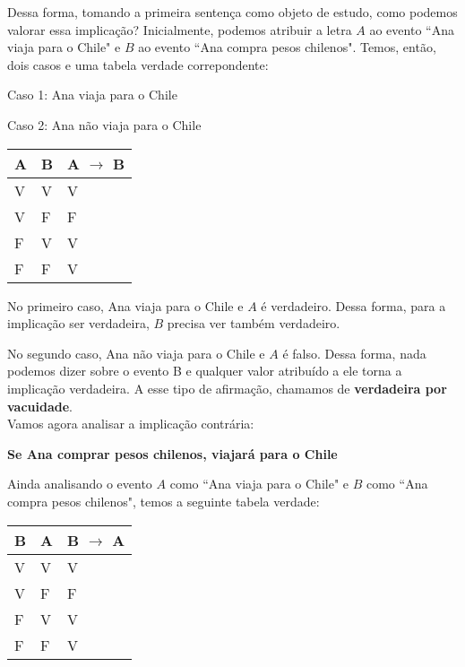 Dessa forma, tomando a primeira sentença como objeto de estudo, como podemos valorar essa implicação?
Inicialmente, podemos atribuir a letra $A$ ao evento ``Ana viaja para o Chile" e $B$ ao evento ``Ana compra pesos chilenos". Temos, então, dois casos e uma tabela verdade correpondente:

\begin{center}

Caso 1: Ana viaja para o Chile 

Caso 2: Ana não viaja para o Chile

\end{center}

\begin{table}[htb]
\centering
\begin{tabular}{|l|l|l|}
\hline

\textbf{A} & \textbf{B} & \textbf{A $\to$ B} \\ \hline
V          & V          & V                  \\ \hline
V          & F          & F                  \\ \hline
F          & V          & V                  \\ \hline
F          & F          & V                  \\ \hline

\end{tabular}
\end{table}

No primeiro caso, Ana viaja para o Chile e $A$ é verdadeiro. Dessa forma, para a implicação ser verdadeira, $B$ precisa ver também verdadeiro.

No segundo caso, Ana não viaja para o Chile e $A$ é falso.
Dessa forma, nada podemos dizer sobre o evento B e qualquer valor atribuído a ele torna a implicação verdadeira. A esse tipo de afirmação, chamamos de \textbf{verdadeira por vacuidade}.\\

Vamos agora analisar a implicação contrária:
\begin{center}

\textbf{Se Ana comprar pesos chilenos, viajará para o Chile}

\end{center}
Ainda analisando o evento $A$ como ``Ana viaja para o Chile" e $B$ como ``Ana compra pesos chilenos", temos a seguinte tabela verdade:

\begin{table}[htb]
\centering
\begin{tabular}{|l|l|l|}
\hline

\textbf{B} & \textbf{A} & \textbf{B $\to$ A} \\ \hline
V          & V          & V                  \\ \hline
V          & F          & F                  \\ \hline
F          & V          & V                  \\ \hline
F          & F          & V                  \\ \hline

\end{tabular}
\end{table}

